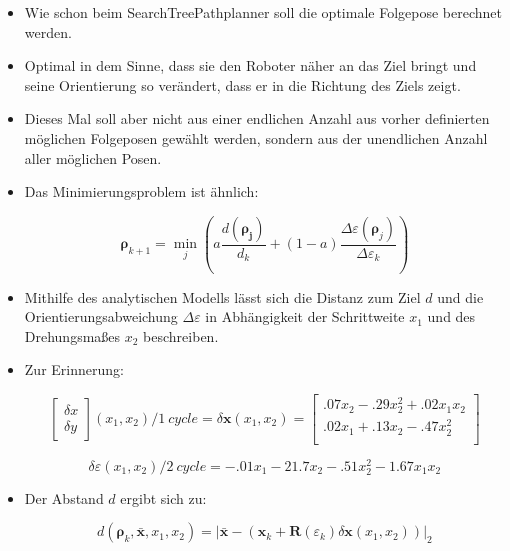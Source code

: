 \documentclass[10pt,a4paper]{article}
\begin{document}
\begin{itemize}
	\item Wie schon beim SearchTreePathplanner soll die optimale Folgepose berechnet werden.
	\item Optimal in dem Sinne, dass sie den Roboter näher an das Ziel bringt und seine Orientierung so verändert, dass er in die Richtung des Ziels zeigt.
	\item Dieses Mal soll aber nicht aus einer endlichen Anzahl aus vorher definierten möglichen Folgeposen gewählt werden, sondern aus der unendlichen Anzahl aller möglichen Posen.
	\item Das Minimierungsproblem ist ähnlich:
	
	\begin{equation}
	\bm{\rho}_{k+1} = \min_{j} \left( a \frac{d(\bm{\rho_j})}{d_k} + (1-a)\frac{\Delta \varepsilon (\bm{\rho}_j)}{\Delta \varepsilon_k} \right)	
	\end{equation}
	
	\item Mithilfe des analytischen Modells lässt sich die Distanz zum Ziel $d$ und die Orientierungsabweichung $\Delta \varepsilon$ in Abhängigkeit der Schrittweite $x_1$ und des Drehungsmaßes $x_2$ beschreiben.
	
	\item Zur Erinnerung:
	
		\begin{equation}
		\begin{bmatrix}	\delta x \\ \delta y \end{bmatrix} (x_1, x_2) / 1~cycle =\delta \bm{x} (x_1, x_2)= \begin{bmatrix}
		.07x_2 - .29 x_2^2 + .02 x_1x_2 \\
		.02x_1 + .13x_2 - .47x_2^2 \\
		\end{bmatrix}
		\end{equation}
		
		\begin{equation}
		\delta \varepsilon (x_1, x_2) / {2~cycle} = -.01x_1 - 21.7 x_2 -.51 x_2^2 - 1.67x_1x_2
		\end{equation}
	
	\item Der Abstand $d$ ergibt sich zu:
	
	\begin{equation}
	d(\bm{\rho}_k, \bar{\bm{x}}, x_1, x_2) = \bigg| \bar{\bm{x}} - \left(\bm{x}_{k} + \bm{R}(\varepsilon_k) \delta \bm{x}(x_1, x_2) \right)\bigg|_2
	\end{equation}	
	

\end{itemize}
\end{document}
